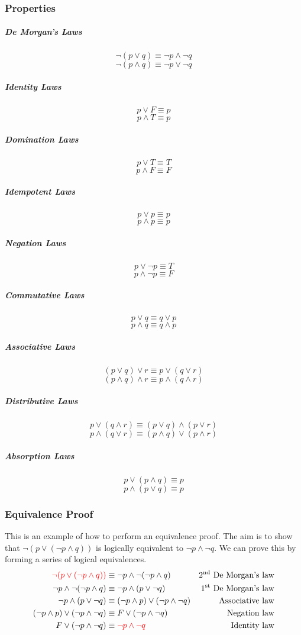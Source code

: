 \documentclass[a4paper, 10pt]{article}
\begin{document}
\subsubsection{Properties}
\begin{multicols}{2}
    \subparagraph{De Morgan's Laws}
    \[ \neg(p\lor q) \equiv \neg p \land \neg q \]
    \[ \neg(p\land q) \equiv \neg p \lor \neg q \]

    \subparagraph{Identity Laws}
    \[ p \lor F \equiv p \]
    \[ p \land T \equiv p \]

    \subparagraph{Domination Laws}
    \[ p \lor T \equiv T \]
    \[ p \land F \equiv F \]

    \subparagraph{Idempotent Laws}
    \[ p \lor p \equiv p\]
    \[p \land p \equiv p\]

    \subparagraph{Negation Laws}
    \[ p \lor \neg p \equiv T \]
    \[ p \land \neg p \equiv F \]

    \subparagraph{Commutative Laws}
    \[ p \lor q \equiv q \lor p \]
    \[ p \land q \equiv q \land p\]

    \subparagraph{Associative Laws}
    \[ (p \lor q)\lor r \equiv p\lor(q\lor r) \]
    \[ (p \land q)\land r \equiv p\land(q\land r) \]

    \subparagraph{Distributive Laws}
    \[ p\lor (q \land r) \equiv (p\lor q) \land (p\lor r) \]
    \[ p\land (q\lor r) \equiv (p\land q)\lor(p\land r) \]

    \subparagraph{Absorption Laws}
    \[ p \lor (p\land q) \equiv p \]
    \[ p \land (p\lor q) \equiv p \]
\end{multicols}

\subsubsection{Equivalence Proof}
This is an example of how to perform an equivalence proof. The aim is to show that \( \neg(p\lor (\neg p \land q)) \) is logically equivalent to \( \neg p\land \neg q \). We can prove this by forming a series of logical equivalences.
\begin{align*}
    \textcolor{red}{\neg (p\lor(\neg p\land q))} &\equiv \neg p \land \neg(\neg p\land q) & \text{2\textsuperscript{nd} De Morgan's law}\\
    \neg p \land \neg(\neg p\land q) &\equiv \neg p \land (p\lor\neg q) & \text{1\textsuperscript{st} De Morgan's law} \\
    \neg p \land (p\lor\neg q) &\equiv (\neg p \land p)\lor(\neg p\land \neg q) & \text{Associative law} \\
    (\neg p \land p)\lor(\neg p\land \neg q) &\equiv F \lor (\neg p \land \neg q) & \text{Negation law} \\
    F \lor (\neg p \land \neg q) &\equiv \textcolor{red}{\neg p \land \neg q} & \text{Identity law}
\end{align*}
\end{document}
